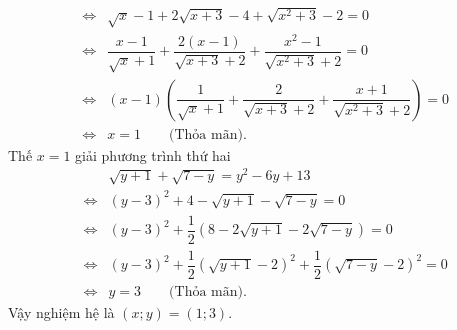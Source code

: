 \begin{ex}
{\begin{enumerate}[1)]
\begin{eqnarray*}
&\Leftrightarrow & \sqrt{x} -1+ 2\sqrt{x+3} -4+ \sqrt{x^2+3} -2=0\\
&\Leftrightarrow & \dfrac{x-1}{\sqrt{x}+1} + \dfrac{2(x-1)}{\sqrt{x+3} +2} + \dfrac{x^2-1}{\sqrt{x^2+3} +2}=0\\
&\Leftrightarrow & (x-1)\left(\dfrac{1}{\sqrt{x}+1} + \dfrac{2}{\sqrt{x+3} +2} + \dfrac{x+1}{\sqrt{x^2+3} +2}\right)=0\\
&\Leftrightarrow & x=1 \qquad \text{(Thỏa mãn)}.
\end{eqnarray*}
Thế $x=1$ giải phương trình thứ hai
\begin{eqnarray*}
&&\sqrt{y+1} + \sqrt{7-y} =y^2-6y+13\\
&\Leftrightarrow &(y-3)^2+4- \sqrt{y+1} - \sqrt{7-y} =0\\
&\Leftrightarrow &(y-3)^2+ \dfrac{1}{2} \left(8- 2\sqrt{y+1} - 2\sqrt{7-y} \right) =0\\
&\Leftrightarrow &(y-3)^2 + \dfrac{1}{2} \left( \sqrt{y+1} - 2 \right)^2 + \dfrac{1}{2} \left( \sqrt{7-y} - 2\right)^2=0\\
&\Leftrightarrow & y=3 \qquad \text{(Thỏa mãn)}.
\end{eqnarray*}
Vậy nghiệm hệ là $(x;y)=(1;3)$.
\end{enumerate}
}
\end{ex}

